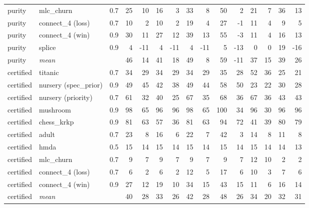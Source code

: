 \begin{tabular}{lllrrrrrrrrrrrr}
purity & mlc\_churn & 0.7 & 25 & 10 & 16 & 3 & 33 & 8 & 50 & 2 & 21 & 7 & 36 & 13\\
purity & connect\_4 (loss) & 0.7 & 10 & 2 & 10 & 2 & 19 & 4 & 27 & -1 & 11 & 4 & 9 & 5\\
purity & connect\_4 (win) & 0.9 & 30 & 11 & 27 & 12 & 39 & 13 & 55 & -3 & 11 & 4 & 16 & 13\\
purity & splice & 0.9 & 4 & -11 & 4 & -11 & 4 & -11 & 5 & -13 & 0 & 0 & 19 & -16\\
purity & \emph{mean} & & 46 & 14 & 41 & 18 & 49 & 8 & 59 & -11 & 37 & 15 & 39 & 26\\
\midrule
certified & titanic & 0.7 & 34 & 29 & 34 & 29 & 34 & 29 & 35 & 28 & 52 & 36 & 25 & 21\\
certified & nursery (spec\_prior) & 0.9 & 49 & 45 & 42 & 38 & 49 & 44 & 58 & 50 & 23 & 22 & 30 & 28\\
certified & nursery (priority) & 0.7 & 61 & 32 & 40 & 25 & 67 & 35 & 68 & 36 & 67 & 36 & 43 & 43\\
certified & mushroom & 0.9 & 98 & 65 & 96 & 96 & 98 & 65 & 100 & 34 & 96 & 30 & 96 & 96\\
certified & chess\_krkp & 0.9 & 81 & 63 & 57 & 36 & 81 & 63 & 94 & 72 & 41 & 39 & 80 & 79\\
certified & adult & 0.7 & 23 & 8 & 16 & 6 & 22 & 7 & 42 & 3 & 14 & 8 & 11 & 8\\
certified & hmda & 0.5 & 15 & 14 & 15 & 14 & 15 & 14 & 15 & 14 & 15 & 14 & 14 & 13\\
certified & mlc\_churn & 0.7 & 9 & 7 & 9 & 7 & 9 & 7 & 9 & 7 & 12 & 10 & 2 & 2\\
certified & connect\_4 (loss) & 0.7 & 6 & 2 & 6 & 2 & 12 & 5 & 17 & 6 & 10 & 3 & 7 & 6\\
certified & connect\_4 (win) & 0.9 & 27 & 12 & 19 & 10 & 34 & 15 & 43 & 15 & 11 & 6 & 16 & 14\\
certified & \emph{mean} & & 40 & 28 & 33 & 26 & 42 & 28 & 48 & 26 & 34 & 20 & 32 & 31\\
\bottomrule
\end{tabular}
